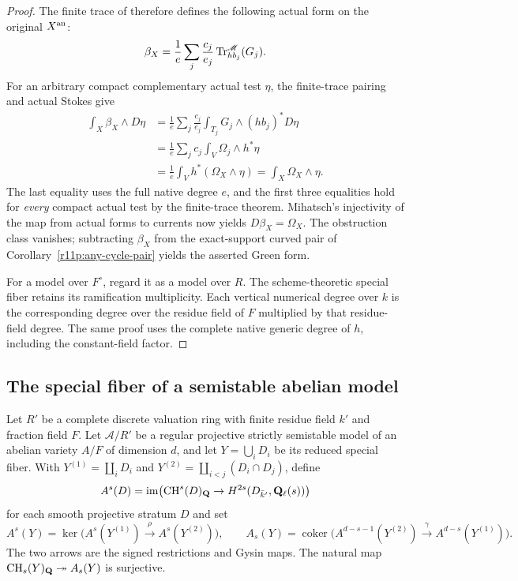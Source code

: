 \begin{proof}
The finite trace of  therefore
defines the following actual form on the original $X^{\mathrm{an}}$:
\begin{equation}\label{eq:descent-primitive}
 \beta_X=\frac1e\sum_j\frac{c_j}{e_j}
                  \operatorname{Tr}^{\mathscr M}_{h b_j}(G_j).
\end{equation}
For an arbitrary compact complementary actual test $\eta$, the
finite-trace pairing and actual Stokes give
\[
 \begin{aligned}
 \int_X\beta_X\wedge D\eta
   &=\frac1e\sum_j\frac{c_j}{e_j}
                   \int_{T_j}G_j\wedge(hb_j)^*D\eta\\
   &=\frac1e\sum_jc_j\int_V\Omega_j\wedge h^*\eta\\
   &=\frac1e\int_Vh^*(\Omega_X\wedge\eta)
     =\int_X\Omega_X\wedge\eta.
 \end{aligned}
\]
The last equality uses the full native degree $e$, and the first
three equalities hold for \emph{every} compact actual test by the
finite-trace theorem.  Mihatsch's injectivity of the map from
actual forms to currents now yields $D\beta_X=\Omega_X$.
The obstruction class vanishes; subtracting $\beta_X$ from the
exact-support curved pair of Corollary~\ref{r11p:any-cycle-pair} yields
the asserted Green form.

For a model over $F^\circ$, regard it as a model over $R$.
The scheme-theoretic special fiber retains its ramification
multiplicity.  Each vertical numerical degree over $k$ is the
corresponding degree over the residue field of $F$ multiplied
by that residue-field degree.  The same proof uses the complete
native generic degree of $h$, including the constant-field factor.
\end{proof}

\subsection{The special fiber of a semistable abelian model}

Let $R'$ be a complete discrete valuation ring with finite residue
field $k'$ and fraction field $F$.  Let $\mathcal A/R'$ be a regular
projective strictly semistable model of an abelian variety $A/F$
of dimension $d$, and let $Y=\bigcup_iD_i$ be its reduced special
fiber.  With $Y^{(1)}=\coprod_iD_i$ and
$Y^{(2)}=\coprod_{i<j}(D_i\cap D_j)$, define
\[
 A^s(D)=\operatorname{im}\bigl(\operatorname{CH}^s(D)_{\mathbf Q}
           \to H^{2s}(D_{\bar k'},\mathbf Q_\ell(s))\bigr)
\]
for each smooth projective stratum $D$ and set
\begin{equation}\label{eq:kun-strata}
 A^s(Y)=\ker\bigl(A^s(Y^{(1)})\xrightarrow{\rho}A^s(Y^{(2)})\bigr),
 \qquad
 A_s(Y)=\operatorname{coker}\bigl(
 A^{d-s-1}(Y^{(2)})\xrightarrow{\gamma}A^{d-s}(Y^{(1)})\bigr).
\end{equation}
The two arrows are the signed restrictions and Gysin maps.
The natural map $\operatorname{CH}_s(Y)_{\mathbf Q}\twoheadrightarrow A_s(Y)$
is surjective.

